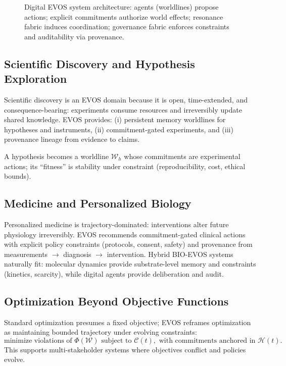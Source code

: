 \documentclass[11pt]{article}
\begin{document}
\begin{figure}[t]
\begin{tikzpicture}
\end{tikzpicture}
\caption{Digital EVOS system architecture: agents (worldlines) propose actions; explicit commitments authorize world effects; resonance fabric induces coordination; governance fabric enforces constraints and auditability via provenance.}
\label{fig:digital-evos-architecture}
\end{figure}


\subsection{Scientific Discovery and Hypothesis Exploration}
\label{sec:app-science}

Scientific discovery is an EVOS domain because it is open, time-extended, and consequence-bearing:
experiments consume resources and irreversibly update shared knowledge. EVOS provides:
(i) persistent memory worldlines for hypotheses and instruments, (ii) commitment-gated experiments,
and (iii) provenance lineage from evidence to claims.

A hypothesis becomes a worldline $\mathcal{W}_h$ whose commitments are experimental actions; its
``fitness'' is stability under constraint (reproducibility, cost, ethical bounds).

\subsection{Medicine and Personalized Biology}
\label{sec:app-medicine}

Personalized medicine is trajectory-dominated: interventions alter future physiology irreversibly.
EVOS recommends commitment-gated clinical actions with explicit policy constraints (protocols,
consent, safety) and provenance from measurements $\rightarrow$ diagnosis $\rightarrow$ intervention.
Hybrid BIO-EVOS systems naturally fit: molecular dynamics provide substrate-level memory and
constraints (kinetics, scarcity), while digital agents provide deliberation and audit.

\subsection{Optimization Beyond Objective Functions}
\label{sec:app-optimization}

Standard optimization presumes a fixed objective; EVOS reframes optimization as maintaining
bounded trajectory under evolving constraints:
\[
\text{minimize violations of } \Phi(\mathcal{W}) \text{ subject to } \mathcal{C}(t), \text{ with commitments anchored in } \mathcal{H}(t).
\]
This supports multi-stakeholder systems where objectives conflict and policies evolve.
\end{document}
